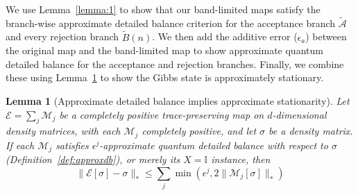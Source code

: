 \documentclass[aps,floatfix,10pt,amssymb,amsfont,amsmath,superscriptaddress,float,nofootinbib,longbibliography,nobalancelastpage,twocolumn]{revtex4-2}
\newtheorem{lemma}{Lemma}
\begin{document}
We use Lemma~\ref{lemma:1} to show that our band-limited maps satisfy the branch-wise approximate detailed balance
criterion for the acceptance branch $\tilde{\mathcal{A}}$ and every rejection branch $\tilde{B}(n)$. We then add the additive error ($\epsilon_a$) between the original map and the band-limited map to show approximate quantum detailed balance for the acceptance and rejection branches. Finally, we combine these using Lemma~\ref{theorem:quantumapproximatedeatildedbalance} to show the Gibbs state is approximately stationary.
\begin{lemma}[Approximate detailed balance implies approximate stationarity]
\label{theorem:quantumapproximatedeatildedbalance}
Let $\mathcal{E} = \sum_j \mathcal{M}_j$ be a completely positive trace-preserving map on $d$-dimensional density matrices, with each $\mathcal{M}_j$ completely positive, and let $\sigma$ be a density matrix. If each $\mathcal{M}_j$ satisfies $\epsilon^j$-approximate quantum detailed balance with respect to $\sigma$ (Definition~\ref{def:approxdb}), or merely its $X=\mathbb{I}$ instance, then
\begin{equation}
     \|\mathcal{E}[\sigma]-\sigma\|_* \leq \sum_j\min\left(\epsilon^j, 2\|\mathcal{M}_j[\sigma]\|_*\right)
\end{equation}
\end{lemma}
\end{document}
